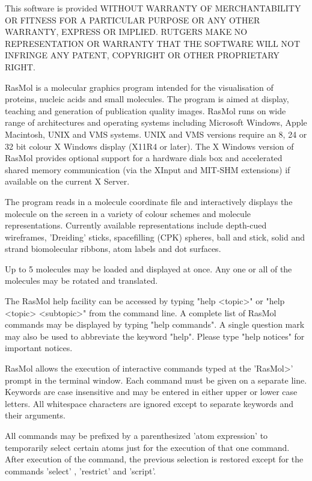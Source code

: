 This software is provided WITHOUT WARRANTY OF MERCHANTABILITY OR FITNESS
FOR A PARTICULAR PURPOSE OR ANY OTHER WARRANTY, EXPRESS OR IMPLIED. RUTGERS
MAKE NO REPRESENTATION OR WARRANTY THAT THE SOFTWARE WILL NOT INFRINGE ANY
PATENT, COPYRIGHT OR OTHER PROPRIETARY RIGHT.

RasMol is a molecular graphics program intended for the visualisation of
proteins, nucleic acids and small molecules.
The program is aimed at display, teaching and generation of
publication quality images.   RasMol runs on wide range of architectures
and operating systems including Microsoft Windows, Apple
Macintosh, UNIX and VMS systems. UNIX and VMS versions require an 8, 24 or
32 bit colour X Windows display (X11R4 or later).  The X Windows version of
RasMol provides optional support for a hardware dials box and accelerated
shared memory communication (via the XInput and MIT-SHM extensions)
if available on the current X Server.

The program reads in a
molecule coordinate file and interactively displays the molecule on the
screen in a variety of colour schemes and molecule representations. Currently
available representations include depth-cued wireframes, 'Dreiding' sticks,
spacefilling (CPK) spheres, ball and stick, solid and strand biomolecular
ribbons, atom labels and dot surfaces.

Up to 5 molecules may be loaded and displayed at once.  Any one or all of
 the molecules may be rotated and translated.

The RasMol help facility can be accessed by typing "help <topic>" or "help
<topic> <subtopic>" from the command line. A complete list of RasMol commands
may be displayed by typing "help commands". A single question mark may also
be used to abbreviate the keyword "help".  Please type "help notices" for
important notices.

RasMol allows the execution of interactive commands typed at the
'RasMol>'
prompt in the terminal window. Each command must be given on
a separate line. Keywords are case insensitive and may be entered in
either upper or lower case letters. All whitespace characters are
ignored except to separate keywords and their arguments.

All commands may be prefixed by a parenthesized
'atom expression'
to temporarily select certain atoms just for the execution
of that one command.  After execution of the command, the
previous selection is restored except for the commands
'select'
,
'restrict'
and
'script'.

